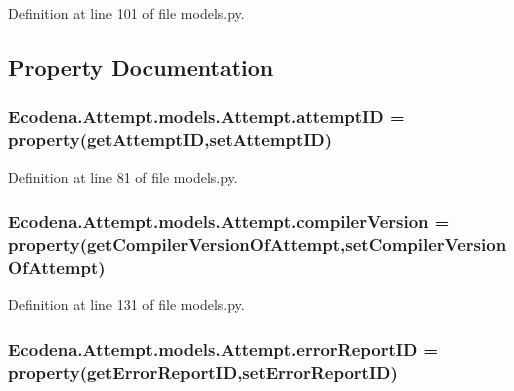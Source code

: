 Definition at line 101 of file models.py.



\subsection{Property Documentation}
\hypertarget{class_ecodena_1_1_attempt_1_1models_1_1_attempt_a69f17e74058d4360d4ca443bd5c27cbc}{
\subsubsection[{attemptID}]{\setlength{\rightskip}{0pt plus 5cm}Ecodena.Attempt.models.Attempt.attemptID = property(getAttemptID,setAttemptID)}}
\label{d5/da0/class_ecodena_1_1_attempt_1_1models_1_1_attempt_a69f17e74058d4360d4ca443bd5c27cbc}


Definition at line 81 of file models.py.

\hypertarget{class_ecodena_1_1_attempt_1_1models_1_1_attempt_a38af788c738d633909699708872e5e3d}{
\subsubsection[{compilerVersion}]{\setlength{\rightskip}{0pt plus 5cm}Ecodena.Attempt.models.Attempt.compilerVersion = property(getCompilerVersionOfAttempt,setCompilerVersionOfAttempt)}}
\label{d5/da0/class_ecodena_1_1_attempt_1_1models_1_1_attempt_a38af788c738d633909699708872e5e3d}


Definition at line 131 of file models.py.

\hypertarget{class_ecodena_1_1_attempt_1_1models_1_1_attempt_a76b4e1e2270faa387469f0a6b5bd47ec}{
\subsubsection[{errorReportID}]{\setlength{\rightskip}{0pt plus 5cm}Ecodena.Attempt.models.Attempt.errorReportID = property(getErrorReportID,setErrorReportID)}}
\label{d5/da0/class_ecodena_1_1_attempt_1_1models_1_1_attempt_a76b4e1e2270faa387469f0a6b5bd47ec}


